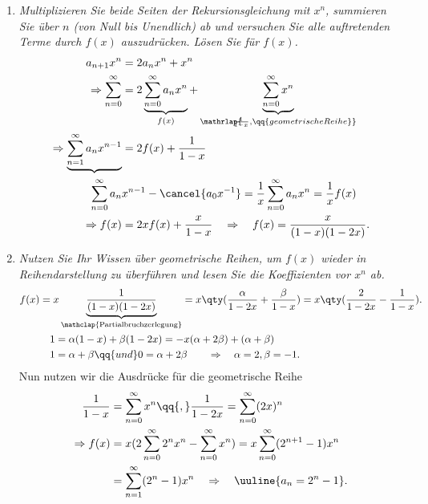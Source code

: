 \begin{enumerate}[label=(\alph*)]
\item \emph{Multiplizieren Sie beide Seiten der Rekursionsgleichung mit $x^n$, summieren Sie über $n$ (von Null bis Unendlich) ab und versuchen Sie alle auftretenden Terme durch $f(x)$ auszudrücken. Lösen Sie für $f(x)$.}
\begin{align}
    a_{n+1} x^n &= 2 a_n x^n + x^n \\
    \Rightarrow \sum_{n=0}^\infty &= 2 \underbrace{\sum_{n=0}^\infty a_n x^n}_{f(x)} + \underbrace{\sum_{n=0}^\infty x^n}_{\mathrlap{\hspace{-0.3cm}\frac{1}{1-x}, \qq{geometrische Reihe}}} \\
    \Rightarrow \underbrace{\sum_{n=1}^\infty a_n x^{n-1}} &= 2 f(x) + \frac{1}{1-x} \\
    \sum_{n=0}^\infty a_n &x^{n-1} - \cancel{a_0 x^{-1}} = \frac{1}{x} \sum_{n=0}^\infty a_n x^n = \frac{1}{x} f(x) \\
    \Rightarrow f(x) &= 2x f(x) + \frac{x}{1-x} \quad \Rightarrow \quad f(x) = \frac{x}{(1-x)(1-2x)}.
\end{align}
\item \emph{Nutzen Sie Ihr Wissen über geometrische Reihen, um $f(x)$ wieder in Reihendarstellung zu überführen und lesen Sie die Koeffizienten vor $x^n$ ab.}
\begin{align}
    f(x) &= x \underbrace{\frac{1}{(1-x)(1-2x)}}_{\mathclap{\text{Partialbruchzerlegung}}} = x \qty(\frac{\alpha}{1-2x} + \frac{\beta}{1-x})= x \qty(\frac{2}{1-2x}-\frac{1}{1-x}).   \\
    &\quad 1 = \alpha(1-x)+\beta(1-2x) = -x(\alpha+2\beta) + (\alpha+\beta) \\
    &\quad 1 = \alpha + \beta \qq{und} 0 =\alpha + 2\beta  \qquad \Rightarrow \quad \alpha = 2, \beta = -1.
\end{align}
Nun nutzen wir die Ausdrücke für die geometrische Reihe 
\begin{align}
    \frac{1}{1-x} &= \sum_{n=0}^\infty x^n \qq{,} \frac{1}{1-2x} = \sum_{n=0}^\infty (2x)^n \\
    \Rightarrow f(x) &= x(2 \sum_{n=0}^\infty 2^n x^n - \sum_{n=0}^\infty x^n) = x \sum_{n=0}^\infty (2^{n+1} - 1) x^n \\
    &= \sum_{n=1}^\infty (2^n -1) x^n \quad \Rightarrow \quad \uuline{a_n = 2^n -1}.
\end{align}
\end{enumerate}
%

